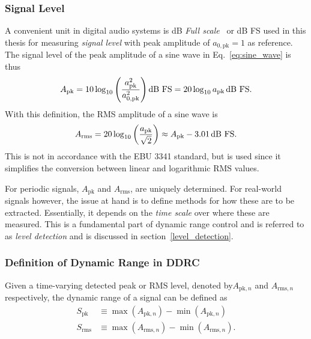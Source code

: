 \documentclass[../main2.tex]{subfiles}
\begin{document}
\subsubsection{Signal Level}
A convenient unit in digital audio systems is dB \emph{Full scale}~\cite{db_fullscale} or dB FS used in this thesis for measuring \emph{signal level} with peak amplitude of $a_{0, \text{pk}} = 1$ as reference. The signal level of the peak amplitude of a sine wave in Eq.~\eqref{eq:sine_wave} is thus
\begin{equation}
A_\text{pk} = 10 \log_{10} \left( \frac{a_\text{pk}^2}{a_{0, \text{pk}}^2} \right) \text{dB FS} = 20 \log_{10} a_\text{pk} \mskip3mu\text{dB FS}.
\end{equation}
With this definition, the RMS amplitude of a sine wave is
\begin{equation}
A_\text{rms} = 20\log_{10} \left( \frac{a_\text{pk}}{\sqrt 2} \right) \approx A_\text{pk} - 3.01 \mskip3mu\text{dB FS}.
\end{equation}
This is not in accordance with the EBU 3341 standard, but is used  since it simplifies the conversion between linear and logarithmic RMS values.

For periodic signals, $A_\text{pk}$ and $A_\text{rms}$, are uniquely determined. For real-world signals however, the issue at hand is to define methods for how these are to be extracted. Essentially, it depends on the \emph{time scale} over where these are measured. This is a fundamental part of dynamic range control and is referred to as \emph{level detection} and is discussed in section~\ref{level_detection}. 

\subsubsection{Definition of Dynamic Range in DDRC}
Given a time-varying detected peak or RMS level,  denoted by$A_{\text{pk},n}$ and $A_{\text{rms},n}$ respectively, the dynamic range of a signal can be defined as
\begin{align}
S_\text{pk} &\equiv \max(A_{\text{pk},n}) - \min(A_{\text{pk},n})\label{eq:s_peak}\\
S_\text{rms} &\equiv \max(A_{\text{rms},n}) - \min(A_{\text{rms},n}).\label{eq:s_rms}
\end{align}
\end{document}
